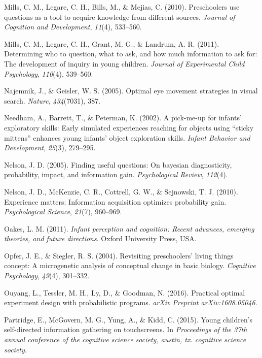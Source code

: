 \documentclass[oneside]{report}
\begin{document}
\hypertarget{ref-mills2010preschoolers}{}
Mills, C. M., Legare, C. H., Bills, M., \& Mejias, C. (2010).
Preschoolers use questions as a tool to acquire knowledge from different
sources. \emph{Journal of Cognition and Development}, \emph{11}(4),
533--560.

\hypertarget{ref-mills2011determining}{}
Mills, C. M., Legare, C. H., Grant, M. G., \& Landrum, A. R. (2011).
Determining who to question, what to ask, and how much information to
ask for: The development of inquiry in young children. \emph{Journal of
Experimental Child Psychology}, \emph{110}(4), 539--560.

\hypertarget{ref-najemnik2005optimal}{}
Najemnik, J., \& Geisler, W. S. (2005). Optimal eye movement strategies
in visual search. \emph{Nature}, \emph{434}(7031), 387.

\hypertarget{ref-needham2002pick}{}
Needham, A., Barrett, T., \& Peterman, K. (2002). A pick-me-up for
infants' exploratory skills: Early simulated experiences reaching for
objects using ``sticky mittens'' enhances young infants' object
exploration skills. \emph{Infant Behavior and Development},
\emph{25}(3), 279--295.

\hypertarget{ref-nelson2005finding}{}
Nelson, J. D. (2005). Finding useful questions: On bayesian
diagnosticity, probability, impact, and information gain.
\emph{Psychological Review}, \emph{112}(4).

\hypertarget{ref-nelson2010experience}{}
Nelson, J. D., McKenzie, C. R., Cottrell, G. W., \& Sejnowski, T. J.
(2010). Experience matters: Information acquisition optimizes
probability gain. \emph{Psychological Science}, \emph{21}(7), 960--969.

\hypertarget{ref-oakes2011infant}{}
Oakes, L. M. (2011). \emph{Infant perception and cognition: Recent
advances, emerging theories, and future directions}. Oxford University
Press, USA.

\hypertarget{ref-opfer2004revisiting}{}
Opfer, J. E., \& Siegler, R. S. (2004). Revisiting preschoolers' living
things concept: A microgenetic analysis of conceptual change in basic
biology. \emph{Cognitive Psychology}, \emph{49}(4), 301--332.

\hypertarget{ref-ouyang2016practical}{}
Ouyang, L., Tessler, M. H., Ly, D., \& Goodman, N. (2016). Practical
optimal experiment design with probabilistic programs. \emph{arXiv
Preprint arXiv:1608.05046}.

\hypertarget{ref-partridge2015young}{}
Partridge, E., McGovern, M. G., Yung, A., \& Kidd, C. (2015). Young
children's self-directed information gathering on touchscreens. In
\emph{Proceedings of the 37th annual conference of the cognitive science
society, austin, tx. cognitive science society}.
\end{document}
